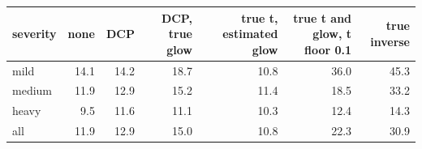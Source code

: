 \begin{tabular}{lrrrrrr}
\toprule
severity & none & DCP & DCP, true glow & true t, estimated glow & true t and glow, t floor 0.1 & true inverse \\
\midrule
mild & 14.1 & 14.2 & 18.7 & 10.8 & 36.0 & 45.3 \\
medium & 11.9 & 12.9 & 15.2 & 11.4 & 18.5 & 33.2 \\
heavy & 9.5 & 11.6 & 11.1 & 10.3 & 12.4 & 14.3 \\
all & 11.9 & 12.9 & 15.0 & 10.8 & 22.3 & 30.9 \\
\bottomrule
\end{tabular}
